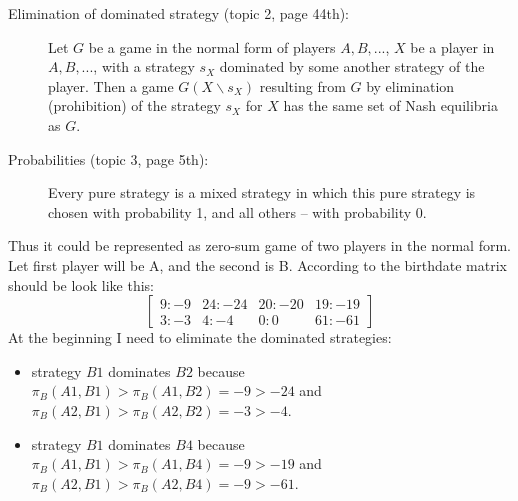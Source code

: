\documentclass[
	a4paper, %
	11pt, %
]{CSUniSchoolLabReport}
\begin{document}
\begin{description}
    \item[Elimination of dominated strategy (topic 2, page 44th):] Let $G$ be a game in the normal form of players $A, B, ...$, $X$ be a player in $A, B, ...$, with a strategy $s_X$ dominated by some another strategy of the player. Then a game $G(X\backslash s_X)$ resulting from $G$ by elimination (prohibition) of the strategy $s_X$ for $X$ has the same set of Nash equilibria as $G$.
    \item[Probabilities (topic 3, page 5th):] Every pure strategy is a mixed strategy in which this pure strategy is chosen with probability 1, and all others – with probability 0.
\end{description}\hspace{2pt}

Thus it could be represented as zero-sum game of two players in the normal form. Let first player will be A, and the second is B.
According to the birthdate matrix should be look like this:
$$
\begin{bmatrix}
    9:-9 & 24:-24 & 20:-20 & 19:-19 \\
    3:-3 & 4:-4 & 0:0 & 61:-61
\end{bmatrix}
$$
At the beginning I need to eliminate the dominated strategies:\\
\begin{itemize}
    \item strategy $B1$ dominates $B2$ because $\pi_B(A1, B1) > \pi_B(A1, B2) = -9 > -24$ and $\pi_B(A2, B1) > \pi_B(A2, B2) = -3 > -4$.
    \item strategy $B1$ dominates $B4$ because $\pi_B(A1, B1) > \pi_B(A1, B4) = -9 > -19$ and $\pi_B(A2, B1) > \pi_B(A2, B4) = -9 > -61$.
\end{itemize}\hspace{2pt}
\end{document}
